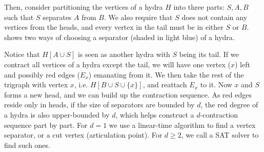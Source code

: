 \documentclass[a4paper,UKenglish,cleveref, autoref, thm-restate]{lipics-v2021}
\begin{document}
Then, consider partitioning the vertices of a hydra $H$ into three parts:
$S, A, B$ such that $S$ separates $A$ from $B$.
%
We also require that $S$ does not contain any vertices from the heads,
and every vertex in the tail must be in either $S$ or $B$.
%
 shows two ways of choosing a separator (shaded in light blue)
of a hydra.

Notice that $H[A \cup S]$ is seen as another hydra with $S$ being its tail.
If we contract all vertices of a hydra except the tail,
we will have one vertex ($x$) left and possibly red edges ($E_x$) emanating from it.
%
We then take the rest of the trigraph with vertex $x$, i.e. $H[B \cup S \cup \{x\}]$,
and reattach $E_x$ to it.
Now $x$ and $S$ forms a new head, and we can build up the contraction sequence.
%
As red edges reside only in heads,
if the size of separators are bounded by $d$,
the red degree of a hydra is also upper-bounded by $d$,
which helps construct a $d$-contraction sequence part by part.
%
For $d=1$ we use a linear-time algorithm to find a vertex separator,
or a cut vertex (articulation point).
For $d \geq 2$, we call a SAT solver to find such ones.








\end{document}
